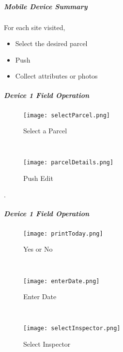  \subparagraph{Mobile Device Summary}

 For each site visited,

 \begin{itemize}
 \item Select the desired parcel
 \item Push 
 \item Collect attributes or photos
 \end{itemize}

 \clearpage


\subparagraph{Device 1 Field Operation}

\begin{wrapfigure}{r}{0.5\textwidth}
\centering
    \texttt{[image: selectParcel.png]}
\caption {Select a Parcel}
\vspace{.25in}

\HRule \\[.4cm] %
\vspace{.25in}

\centering
    \texttt{[image: parcelDetails.png]}
\caption{Push Edit}
\end{wrapfigure}
.
\vspace{2.5in}

\vspace{4.5in}

\clearpage
\subparagraph*{Device 1 Field Operation}
\begin{wrapfigure}{r}{0.4\textwidth}
\centering
    \texttt{[image: printToday.png]}
\caption {Yes or No}
\vspace{.05in}

\HRule \\[.4cm] %
\vspace{.05in}

    \texttt{[image: enterDate.png]}
\caption{Enter Date}
\vspace{.05in}

\HRule \\[.4cm] %
\vspace{.05in}

    \texttt{[image: selectInspector.png]}
\caption{Select Inspector}
\end{wrapfigure}

